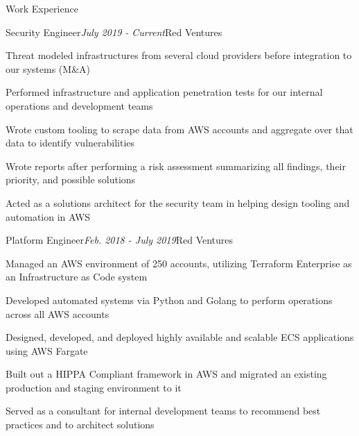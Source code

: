 \documentclass{resume} %
\begin{document}
\begin{rSection}{\vspace{-5pt}Work Experience}

  \begin{rSubsection}{Security Engineer}{\em July 2019 - Current}{Red Ventures}{}
  \item {Threat modeled infrastructures from several cloud providers before integration to our systems (M\&A)}
  \item {Performed infrastructure and application penetration tests for our internal operations and development teams}
  \item {Wrote custom tooling to scrape data from AWS accounts and aggregate over that data to identify vulnerabilities}
  \item {Wrote reports after performing a risk assessment summarizing all findings, their priority, and possible solutions}
  \item {Acted as a solutions architect for the security team in helping design tooling and automation in AWS}

  \end{rSubsection}



\begin{rSubsection}{Platform Engineer}{\em Feb. 2018 - July 2019}{Red Ventures}{}
\item {Managed an AWS environment of 250 accounts, utilizing Terraform Enterprise as an Infrastructure as Code system}
\item {Developed automated systems via Python and Golang to perform operations across all AWS accounts}
\item {Designed, developed, and deployed highly available and scalable ECS applications using AWS Fargate}
\item {Built out a HIPPA Compliant framework in AWS and migrated an existing production and staging environment to it}
\item {Served as a consultant for internal development teams to recommend best practices and to architect solutions}

\end{rSubsection}




\end{rSection}
\end{document}
